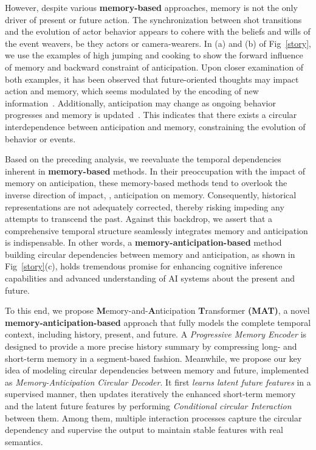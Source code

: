 However, despite various \textbf{memory-based} approaches, memory is not the only driver of present or future action.
The synchronization between shot transitions and the evolution of actor behavior appears to cohere with the beliefs and wills of the event weavers, be they actors or camera-wearers. In (a) and (b) of Fig~\ref{story}, we use the examples of high jumping and cooking to show the forward influence of memory and backward constraint of anticipation.
Upon closer examination of both examples, it has been observed that future-oriented thoughts may impact action and memory, which seems modulated by the encoding of new information~\cite{2007ghosts,mcn}. 
Additionally, anticipation may change as ongoing behavior progresses and memory is updated~\cite{15active, 17neuroscience}. 
This indicates that there exists a circular interdependence between anticipation and memory,
constraining the evolution of behavior or events.



Based on the preceding analysis, we reevaluate the temporal dependencies inherent in \textbf{memory-based} methods. In their preoccupation with the impact of memory on anticipation, these memory-based methods tend to overlook the inverse direction of impact, \ie, anticipation on memory. Consequently, historical representations are not adequately corrected, thereby risking impeding any attempts to transcend the past. Against this backdrop, we assert that a comprehensive temporal structure seamlessly integrates memory and anticipation is indispensable. In other words, a \textbf{memory-anticipation-based} method building circular dependencies between memory and anticipation, as shown in Fig~\ref{story}(c), holds tremendous promise for enhancing cognitive inference capabilities and advanced understanding of AI systems about the present and future.

To this end, we propose \textbf{M}emory-and-\textbf{A}nticipation \textbf{T}ransformer \textbf{(MAT)}, a novel \textbf{memory-anticipation-based} approach that fully
models the complete temporal context, including history, present, and future.
A \emph{Progressive Memory Encoder} is designed to provide a more precise history summary by compressing long- and short-term memory in a segment-based fashion.
Meanwhile, we propose our key idea of modeling circular dependencies between memory and future, implemented as  \emph{Memory-Anticipation Circular Decoder}. It first \emph{learns latent future features} in a supervised manner, then updates iteratively the enhanced short-term memory and the latent future features by performing \emph{Conditional circular Interaction} between them. Among them, multiple interaction processes capture the circular dependency and supervise the output to maintain stable features with real semantics. 


